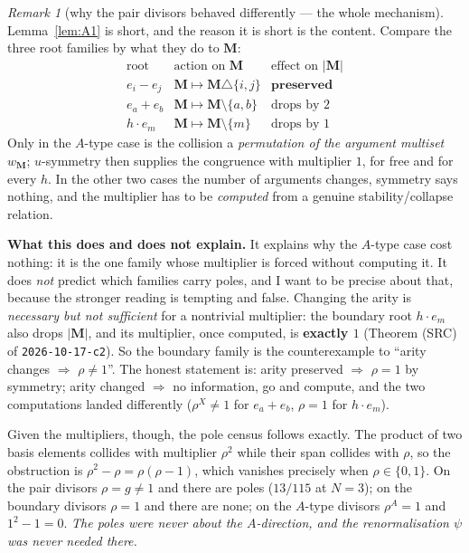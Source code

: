 \documentclass[11pt]{article}
\theoremstyle{plain}
\theoremstyle{definition}
\theoremstyle{remark}
\newtheorem{rem}[thm]{Remark}
\theoremstyle{plain}
\newcommand{\bM}{\mathbf{M}}
\newcommand{\sm}{\setminus}
\begin{document}
\begin{rem}[why the pair divisors behaved differently --- the whole mechanism]
\label{rem:mech}
Lemma~\ref{lem:A1} is short, and the reason it is short is the content.  Compare
the three root families by what they do to $\bM$:
\[
\begin{array}{lll}
\text{root} & \text{action on }\bM & \text{effect on }|\bM| \\\hline
e_i-e_j & \bM\mapsto\bM\triangle\{i,j\} & \textbf{preserved} \\
e_a+e_b & \bM\mapsto\bM\sm\{a,b\} & \text{drops by }2 \\
h\cdot e_m & \bM\mapsto\bM\sm\{m\} & \text{drops by }1
\end{array}
\]
Only in the $A$-type case is the collision a \emph{permutation of the argument
multiset} $w_\bM$; $u$-symmetry then supplies the congruence with multiplier $1$,
for free and for every $h$.  In the other two cases the number of arguments
changes, symmetry says nothing, and the multiplier has to be \emph{computed} from
a genuine stability/collapse relation.

\textbf{What this does and does not explain.}  It explains why the $A$-type case
cost nothing: it is the one family whose multiplier is forced without computing
it.  It does \emph{not} predict which families carry poles, and I want to be
precise about that, because the stronger reading is tempting and false.  Changing
the arity is \emph{necessary but not sufficient} for a nontrivial multiplier: the
boundary root $h\cdot e_m$ also drops $|\bM|$, and its multiplier, once computed,
is \textbf{exactly $1$} (Theorem (SRC) of \texttt{2026-10-17-c2}).  So the
boundary family is the counterexample to ``arity changes $\Rightarrow$
$\rho\ne1$''.  The honest statement is: arity preserved $\Rightarrow$ $\rho=1$
by symmetry; arity changed $\Rightarrow$ no information, go and compute, and the
two computations landed differently ($\rho^X\ne1$ for $e_a+e_b$, $\rho=1$ for
$h\cdot e_m$).

Given the multipliers, though, the pole census follows exactly.  The product of
two basis elements collides with multiplier $\rho^2$ while their span collides
with $\rho$, so the obstruction is $\rho^2-\rho=\rho(\rho-1)$, which vanishes
precisely when $\rho\in\{0,1\}$.  On the pair divisors $\rho=g\ne1$ and there are
poles ($13/115$ at $N=3$); on the boundary divisors $\rho=1$ and there are none;
on the $A$-type divisors $\rho^A=1$ and $1^2-1=0$.  \emph{The poles were never
about the $A$-direction, and the renormalisation $\psi$ was never needed there.}
\end{rem}
\end{document}
